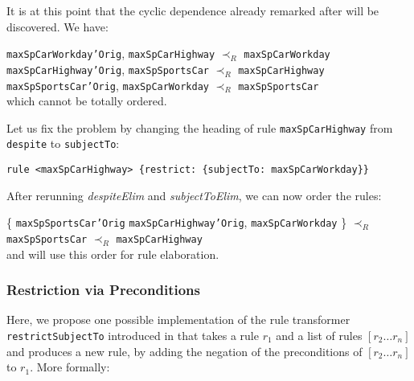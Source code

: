 \begin{example}
It is at this point that the cyclic dependence already remarked after
 will be discovered. We have:

\noindent
\texttt{maxSpCarWorkday'Orig}, \texttt{maxSpCarHighway} $\prec_R$ \texttt{maxSpCarWorkday}\\
\texttt{maxSpCarHighway'Orig}, \texttt{maxSpSportsCar} $\prec_R$ \texttt{maxSpCarHighway}\\
\texttt{maxSpSportsCar'Orig}, \texttt{maxSpCarWorkday} $\prec_R$  \texttt{maxSpSportsCar}\\
\noindent
which cannot be totally ordered.

Let us fix the problem by changing the heading of rule
\texttt{maxSpCarHighway} from \texttt{despite} to \texttt{subjectTo}:
\begin{lstlisting}
rule <maxSpCarHighway> {restrict: {subjectTo: maxSpCarWorkday}}
\end{lstlisting}

After rerunning \emph{despiteElim} and \emph{subjectToElim}, we can now order
the rules:


\noindent
\{ \texttt{maxSpSportsCar'Orig}
\texttt{maxSpCarHighway'Orig},
\texttt{maxSpCarWorkday} \} $\prec_R$
\texttt{maxSpSportsCar} $\prec_R$
\texttt{maxSpCarHighway}\\
and will use this order for rule elaboration.
\end{example}


\subsubsection{Restriction via Preconditions}\label{sec:restr_precond}

Here, we propose one possible implementation of the rule transformer
\texttt{restrictSubjectTo} introduced in  that takes
a rule $r_1$ and a list of rules $[r_2 \dots r_n]$ and produces a new rule, by
adding the negation of the preconditions of $[r_2 \dots r_n]$ to $r_1$. More
formally:

